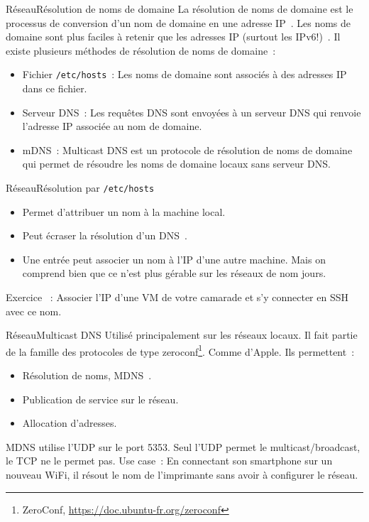 \documentclass{beamer}
\begin{document}
    \begin{frame}{Réseau}{Résolution de noms de domaine}
        La résolution de noms de domaine est le processus de conversion d'un nom de domaine en une adresse IP~.
        \bigbreak
        Les noms de domaine sont plus faciles à retenir que les adresses IP (surtout les IPv6!)~.
        \bigbreak
        Il existe plusieurs méthodes de résolution de noms de domaine~:
        \begin{itemize}
            \item Fichier \lstinline{/etc/hosts}~: Les noms de domaine sont associés à des adresses IP dans ce fichier.
            \item Serveur DNS~: Les requêtes DNS sont envoyées à un serveur DNS qui renvoie l'adresse IP associée au nom de domaine.
            \item mDNS~: Multicast DNS est un protocole de résolution de noms de domaine qui permet de résoudre les noms de domaine locaux sans serveur DNS.
        \end{itemize}
    \end{frame}

    \begin{frame}{Réseau}{Résolution par \lstinline{/etc/hosts}}
        \begin{itemize}
            \item Permet d'attribuer un nom à la machine local.
            \item Peut écraser la résolution d'un DNS~.
            \item Une entrée peut associer un nom à l'IP d'une autre machine.
            Mais on comprend bien que ce n'est plus gérable sur les réseaux de nom jours.
        \end{itemize}
        \bigbreak
        Exercice \execcounterdispinc~: Associer l'IP d'une VM de votre camarade et s'y connecter en SSH avec ce nom.
    \end{frame}

    \begin{frame}{Réseau}{Multicast DNS}
        Utilisé principalement sur les réseaux locaux.
        Il fait partie de la famille des protocoles de type zeroconf\footnote{ZeroConf, \url{https://doc.ubuntu-fr.org/zeroconf}}.
        Comme  d'Apple.
        Ils permettent~:
        \begin{itemize}
            \item  Résolution de noms, MDNS~.
            \item  Publication de service sur le réseau.
            \item  Allocation d'adresses.
        \end{itemize}
        \bigbreak
        MDNS utilise l'UDP sur le port 5353.
        Seul l'UDP permet le multicast/broadcast, le TCP ne le permet pas.
        \bigbreak
        Use case~: En connectant son smartphone sur un nouveau WiFi, il résout le nom de l'imprimante sans avoir à configurer le réseau.
    \end{frame}
\end{document}
